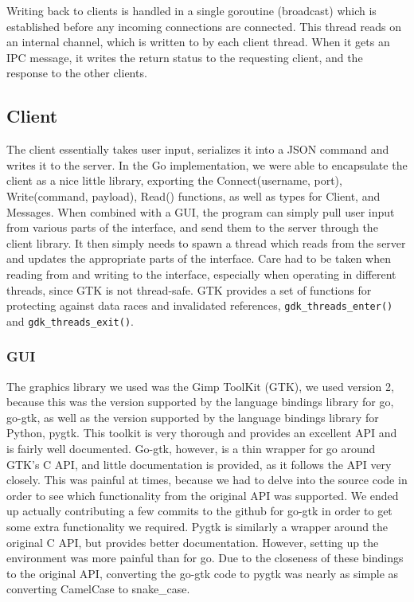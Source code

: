 \documentclass[12pt, letterpaper]{article}
\begin{document}
Writing back to clients is handled in a single goroutine (broadcast)
which is established before any incoming connections are connected.
This thread reads on an internal channel, which is written to by each
client thread. When it gets an IPC message, it writes the return status
to the requesting client, and the response to the other clients.

\subsection*{Client}

The client essentially takes user input, serializes it into a JSON
command and writes it to the server. In the Go implementation, we were
able to encapsulate the client as a nice little library, exporting the
Connect(username, port), Write(command, payload), Read() functions, as
well as types for Client, and Messages. When combined with a GUI, the
program can simply pull user input from various parts of the interface,
and send them to the server through the client library. It then simply
needs to spawn a thread which reads from the server and updates the
appropriate parts of the interface. Care had to be taken when reading
from and writing to the interface, especially when operating in
different threads, since GTK is not thread-safe. GTK provides a set of
functions for protecting against data races and invalidated references,
\verb+gdk_threads_enter()+ and \verb+gdk_threads_exit()+.

\subsubsection*{GUI}

The graphics library we used was the Gimp ToolKit (GTK), we used 
version 2, because this was the version supported by the language 
bindings library for go, go-gtk, as well as the version supported by 
the language bindings library for Python, pygtk. This toolkit is very 
thorough and provides an excellent API and is fairly well documented. 
Go-gtk, however, is a thin wrapper for go around GTK's C API, and 
little documentation is provided, as it follows the API very closely. 
This was painful at times, because we had to delve into the source code 
in order to see which functionality from the original API was 
supported. We ended up actually contributing a few commits to the 
github for go-gtk in order to get some extra functionality we required. 
Pygtk is similarly a wrapper around the original C API, but provides 
better documentation. However, setting up the environment was more 
painful than for go. Due to the closeness of these bindings to the 
original API, converting the go-gtk code to pygtk was nearly as simple 
as converting CamelCase to snake\_case.
\end{document}
